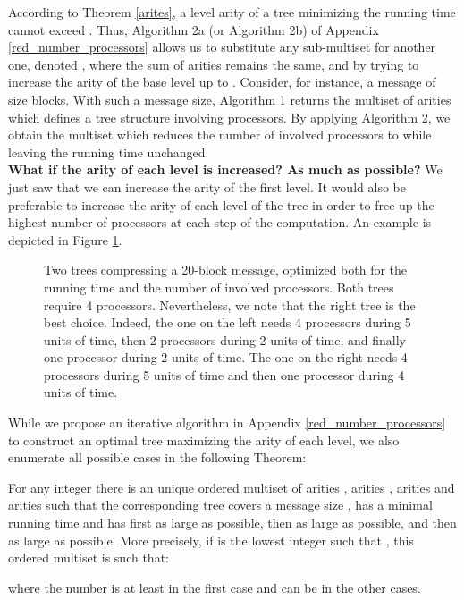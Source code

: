 \documentclass{llncs}
\begin{document}
According to Theorem \ref{arites}, a level arity of a tree minimizing the running time cannot exceed . 
Thus, Algorithm 2a (or Algorithm 2b) of Appendix \ref{red_number_processors} allows us to substitute any sub-multiset  for 
another one, denoted , where the sum of arities remains the same, 
and by trying to increase the arity of the base level up to .
Consider, for instance, a message of size  blocks. With such a message size, Algorithm 1 returns the multiset of arities 
which defines a tree structure involving  processors.
By applying Algorithm 2, we obtain the multiset  which reduces the number of involved processors to  
while leaving the running time unchanged.
~\\

\noindent
\textbf{What if the arity of each level is increased? As much as possible?}
We just saw 
that we can increase the arity of the first level.
It would also be preferable to increase the arity of each level of the tree in order to free up the highest number of processors 
at each step of the computation. An example is depicted in Figure \ref{Gain_proc}.
\begin{figure}[h]
  \centering
 \caption{Two trees compressing a 20-block message, optimized both for the running time and the number of involved processors. 
 Both trees require 4 processors.
 Nevertheless, we note that the right tree is the best choice. Indeed, the one on the left needs 4 processors during 5 units of time,
 then 2 processors during 2 units of time, and finally one processor during 2 units of time. The one on the right needs 4 processors during 5 units of time and then one processor during 4 units 
 of time.}
\label{Gain_proc}
\end{figure}

While we propose an iterative algorithm in Appendix \ref{red_number_processors} to construct an optimal tree maximizing the arity of each level, we also 
enumerate all possible cases in the following Theorem:

\begin{theorem}\label{min_running_time_max_arities}
For any integer  there is an unique ordered multiset 
of  arities ,  arities ,  arities  and  arities 
such that the corresponding tree covers a message size , has a minimal running time
and has first  as large as possible, then  as large as possible, and then 
 as large as possible.
More precisely, if  is the lowest integer such that , 
this ordered multiset is such that:

where the number  is at least  in the first case and can be  in the other cases. 
\end{theorem}
\end{document}
